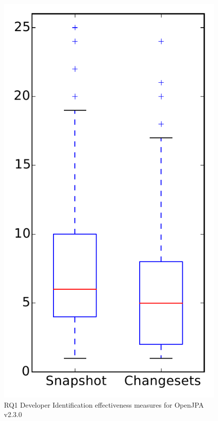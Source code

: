 
\begin{figure}
\centering
\includegraphics[height=0.4\textheight]{figures/dit/rq1_openjpa}
\caption{RQ1 Developer Identification effectiveness measures for OpenJPA v2.3.0}
\label{fig:dit:rq1:openjpa}
\end{figure}
